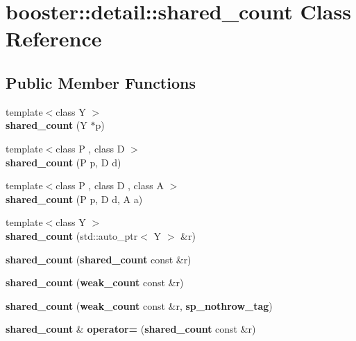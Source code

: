\section{booster\-:\-:detail\-:\-:shared\-\_\-count Class Reference}
\label{classbooster_1_1detail_1_1shared__count}
\subsection*{Public Member Functions}
\begin{DoxyCompactItemize}
\item 
{\footnotesize template$<$class Y $>$ }\\{\bfseries shared\-\_\-count} (Y $\ast$p)\label{classbooster_1_1detail_1_1shared__count_a4ce5c246ea8c1bd5af70f348b30c2d22}

\item 
{\footnotesize template$<$class P , class D $>$ }\\{\bfseries shared\-\_\-count} (P p, D d)\label{classbooster_1_1detail_1_1shared__count_a8f9da198bb47c5e4b2b3b6a4561ab9e8}

\item 
{\footnotesize template$<$class P , class D , class A $>$ }\\{\bfseries shared\-\_\-count} (P p, D d, A a)\label{classbooster_1_1detail_1_1shared__count_abaf623b57b2781e8aa61e4a42f74bf33}

\item 
{\footnotesize template$<$class Y $>$ }\\{\bfseries shared\-\_\-count} (std\-::auto\-\_\-ptr$<$ Y $>$ \&r)\label{classbooster_1_1detail_1_1shared__count_a2c6839fce2332dd54223625c5359b443}

\item 
{\bfseries shared\-\_\-count} ({\bf shared\-\_\-count} const \&r)\label{classbooster_1_1detail_1_1shared__count_aef86aa9561b40e8a5577960f8fb9e718}

\item 
{\bfseries shared\-\_\-count} ({\bf weak\-\_\-count} const \&r)\label{classbooster_1_1detail_1_1shared__count_a7ec7df6edb6c6dba29b4844151ebc696}

\item 
{\bfseries shared\-\_\-count} ({\bf weak\-\_\-count} const \&r, {\bf sp\-\_\-nothrow\-\_\-tag})\label{classbooster_1_1detail_1_1shared__count_a7cecf7e90b810ab6ca77948c760ca395}

\item 
{\bf shared\-\_\-count} \& {\bfseries operator=} ({\bf shared\-\_\-count} const \&r)\label{classbooster_1_1detail_1_1shared__count_ab0fcc7b8bf85f16f55f121b292bf0d23}


\end{DoxyCompactItemize}
